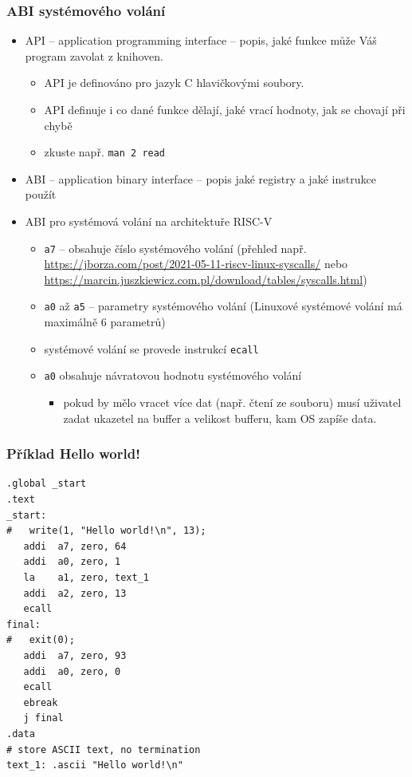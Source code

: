 \documentclass{beamer}
\begin{document}
\begin{frame}[shrink=5]
\frametitle{ABI systémového volání}

\begin{itemize}
\item API -- application programming interface -- popis, jaké funkce může Váš program zavolat z knihoven.
\begin{itemize}
\item API je definováno pro jazyk C hlavičkovými soubory.
\item API definuje i co dané funkce dělají, jaké vrací hodnoty, jak se chovají při chybě
\item zkuste např. \texttt{man 2 read}
\end{itemize}
\item ABI -- application binary interface -- popis jaké registry a jaké instrukce použít
\item ABI pro systémová volání na architektuře RISC-V
\begin{itemize}
\item \texttt{a7} -- obsahuje číslo systémového volání (přehled např. \url{https://jborza.com/post/2021-05-11-riscv-linux-syscalls/} nebo \url{https://marcin.juszkiewicz.com.pl/download/tables/syscalls.html})
\item \texttt{a0} až \texttt{a5} -- parametry systémového volání (Linuxové systémové volání má maximálně 6 parametrů)
\item systémové volání se provede instrukcí \texttt{ecall}
\item \texttt{a0} obsahuje návratovou hodnotu systémového volání
\begin{itemize}
\item pokud by mělo vracet více dat (např. čtení ze souboru) musí uživatel zadat ukazetel na buffer a velikost bufferu, kam OS zapíše data.
\end{itemize}
\end{itemize}
\end{itemize}

\end{frame}

\begin{frame}[fragile]
\frametitle{Příklad Hello world!}


\begin{verbatim}
.global _start
.text
_start:
#   write(1, "Hello world!\n", 13);
   addi  a7, zero, 64
   addi  a0, zero, 1
   la    a1, zero, text_1
   addi  a2, zero, 13
   ecall
final:
#   exit(0);
   addi  a7, zero, 93
   addi  a0, zero, 0
   ecall
   ebreak
   j final
.data
# store ASCII text, no termination
text_1: .ascii "Hello world!\n"
\end{verbatim}
\end{frame}
\end{document}
